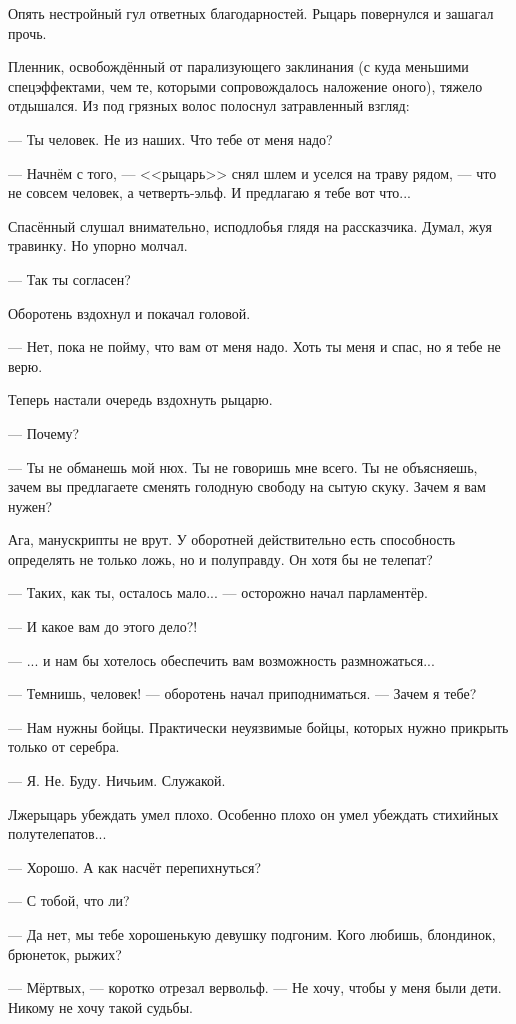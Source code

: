\begin{achronic}
Опять нестройный гул ответных благодарностей. Рыцарь повернулся и зашагал прочь.

\emptypar

Пленник, освобождённый от парализующего заклинания
(с куда меньшими спецэффектами, чем те, которыми сопровождалось наложение оного), тяжело отдышался.
Из под грязных волос полоснул затравленный взгляд:

--- Ты человек. Не из наших. Что тебе от меня надо?

--- Начнём с того, --- <<рыцарь>> снял шлем и уселся на траву рядом, --- что не совсем человек, а четверть-эльф.
И предлагаю я тебе вот что...

Спасённый слушал внимательно, исподлобья глядя на рассказчика. Думал, жуя травинку. Но упорно молчал.

--- Так ты согласен?

Оборотень вздохнул и покачал головой.

--- Нет, пока не пойму, что вам от меня надо. Хоть ты меня и спас, но я тебе не верю.

Теперь настали очередь вздохнуть рыцарю.

--- Почему?

--- Ты не обманешь мой нюх. Ты не говоришь мне всего.
Ты не объясняешь, зачем вы предлагаете сменять голодную свободу на сытую скуку. Зачем я вам нужен?

Ага, манускрипты не врут. У оборотней действительно есть способность определять не только ложь, но и полуправду.
Он хотя бы не телепат?

--- Таких, как ты, осталось мало... --- осторожно начал парламентёр.

--- И какое вам до этого дело?!

--- ... и нам бы хотелось обеспечить вам возможность размножаться...

--- Темнишь, человек! --- оборотень начал приподниматься. --- Зачем я тебе?

--- Нам нужны бойцы. Практически неуязвимые бойцы, которых нужно прикрыть только от серебра.

--- Я. Не. Буду. Ничьим. Служакой.

Лжерыцарь убеждать умел плохо. Особенно плохо он умел убеждать стихийных полутелепатов...

--- Хорошо. А как насчёт перепихнуться?

--- С тобой, что ли?

--- Да нет, мы тебе хорошенькую девушку подгоним. Кого любишь, блондинок, брюнеток, рыжих?

--- Мёртвых, --- коротко отрезал вервольф. --- Не хочу, чтобы у меня были дети. Никому не хочу такой судьбы.

\end{achronic}

